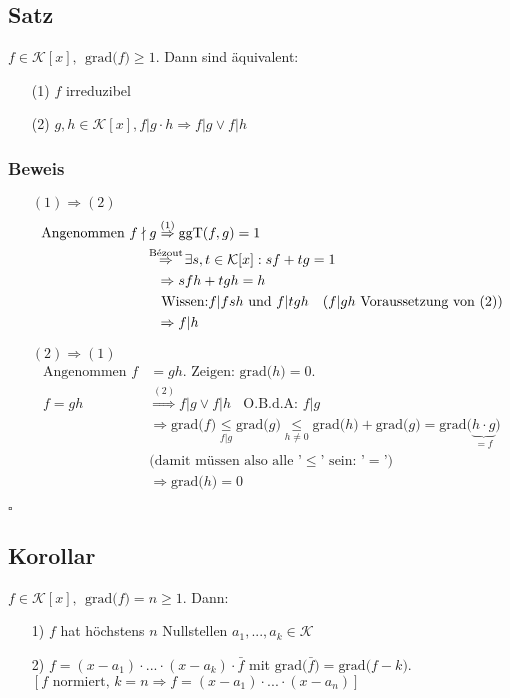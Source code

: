 \documentclass[12pt,titlepage, pdf]{article}
\newcommand{\grad}[1]{\textrm{grad(}#1\textrm{)}}
\newcommand{\K}{\mathcal{K}}
\newcommand{\qed}{\hfill$\square$}
\renewcommand{\>}{\rightarrow}
\renewcommand{\*}{\cdot}
\begin{document}
\subsection{Satz}
$f \in \K[x], ~~\grad{f} \geq 1$. Dann sind äquivalent: 
\begin{itemize}
	\item[(1)] $f$ irreduzibel
	\item[(2)] $g,h \in \K[x], f \vert g\cdot h \Rightarrow f \vert g \lor f\vert h$
\end{itemize}
\subsubsection*{Beweis}
\begin{itemize}
	\item[$(1)\Rightarrow (2)$] 
	\begin{align*}
	\text{Angenommen }f \nmid g &\overset{(1)}{\Rightarrow} \text{ggT}(f,g) = 1 \\&~~\mathclap{\overset{\textrm{Bézout}}{\Rightarrow}} ~~~~ \exists s,t \in \K[x]: sf  + tg = 1\\
	&\Rightarrow sfh + tgh = h\\
	&\text{ Wissen:} f \vert fsh \text{ und } f \vert tgh~~~ \text{($f\vert gh$ Voraussetzung von (2)}) \\
	&\Rightarrow f \vert h 
	\end{align*}
	\item[$(2)\Rightarrow (1)$] 
	\begin{align*}
	\text{Angenommen }f&=gh\text{. Zeigen: }\grad{h}=0.\\
	f = gh &\overset{(2)}{\Rightarrow} f \vert g \lor f \vert h ~~~~\text{O.B.d.A: } f \vert g \\
	&\Rightarrow \grad{f} \underset{f\vert g}{\leq}  \grad{g}
	 \underset{h\neq0}{\leq} \grad{h} + \grad{g} = \grad{\underbrace{h \cdot g}_{= f}} \\
	 &\text{(damit müssen also alle '$\leq$' sein: '$=$')}\\
	&\Rightarrow \grad{h} = 0
	\end{align*}
\end{itemize}
\qed
\subsection{Korollar}
$f \in \K[x],~~ \grad{f} = n \geq 1$. Dann: 
\begin{itemize}
	\item[1)] $f$ hat höchstens $n$ Nullstellen $a_1,...,a_k \in \K$
	\item[2)] $f = (x-a_1) \cdot ... \cdot (x -a_k) \cdot \bar{f}$ mit  $\grad{\bar{f}} = \grad{f -k}$.\\
	$[f \text{ normiert, } k = n \Rightarrow f=(x-a_1) \cdot ... \cdot (x-a_n)]$
\end{itemize}
\end{document}
